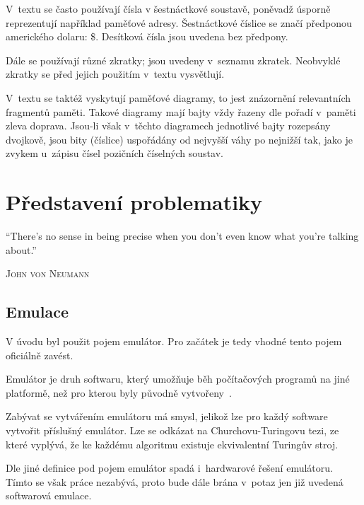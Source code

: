 \begin{note*}[Značení]
	V~textu se často používají čísla v šestnáctkové soustavě, poněvadž úsporně reprezentují například paměťové adresy. Šestnáctkové číslice se značí předponou amerického dolaru: \$. Desítková čísla jsou uvedena bez předpony.
	
	Dále se používají různé zkratky; jsou uvedeny v~seznamu zkratek. Neobvyklé zkratky se před jejich použitím v~textu vysvětlují.
	
	V~textu se taktéž vyskytují paměťové diagramy, to jest znázornění relevantních fragmentů paměti. Takové diagramy mají bajty vždy řazeny dle pořadí v~paměti zleva doprava. Jsou-li však v~těchto diagramech jednotlivé bajty rozepsány dvojkově, jsou bity (číslice) uspořádány od nejvyšší váhy po nejnižší tak, jako je zvykem u~zápisu čísel pozičních číselných soustav.
\end{note*}

\chapter{Představení problematiky}
\label{chap:predstaveni-problematiky}

\epigraph{
	\enquote{There's no sense in being precise when you don't even know what you're talking about.}
}{\textsc{John von Neumann}}

\section{Emulace}
V úvodu byl použit pojem emulátor. Pro začátek je tedy vhodné tento pojem oficiálně zavést.

\begin{definition}[Emulátor]
	Emulátor je druh softwaru, který umožňuje běh počítačových programů na jiné platformě, než pro kterou byly původně vytvořeny~\cite{Wikipedia:emulator}.
\end{definition}

\begin{note}[Emulovatelnost]
	Zabývat se vytvářením emulátoru má smysl, jelikož lze pro každý software vytvořit příslušný emulátor. Lze se odkázat na Churchovu-Turingovu tezi, ze které vyplývá, že ke každému algoritmu existuje ekvivalentní Turingův stroj.
\end{note}

Dle jiné definice pod pojem emulátor spadá i~hardwarové řešení emulátoru. Tímto se však práce nezabývá, proto bude dále brána v~potaz jen již uvedená softwarová emulace.


